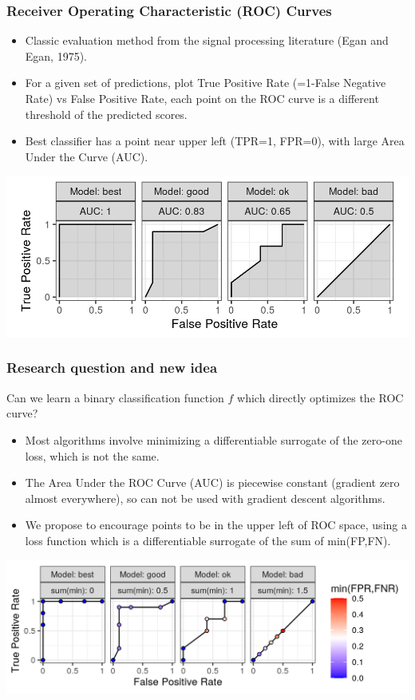 \documentclass[t]{beamer}
\begin{document}
\begin{frame}
  \frametitle{Receiver Operating Characteristic (ROC) Curves}
  \begin{itemize}
  \item Classic evaluation method from the signal processing
    literature (Egan and Egan, 1975).
  \item For a given set of predictions, plot True Positive Rate
    (=1-False Negative Rate) vs False Positive Rate, each point on the
    ROC curve is a different threshold of the predicted scores.
  \item Best classifier has a point near upper left (TPR=1, FPR=0), with large
    Area Under the Curve (AUC).
  \end{itemize}
  \includegraphics[width=\textwidth]{figure-more-than-one-binary}
\end{frame}

\begin{frame}
  \frametitle{Research question and new idea}
  Can we learn a binary classification function $f$ which directly
  optimizes the ROC curve?
  \begin{itemize}
  \item Most algorithms involve minimizing a differentiable surrogate
    of the zero-one loss, which is not the same.
  \item The Area Under the ROC Curve (AUC) is piecewise constant
    (gradient zero almost everywhere), so can not be used with
    gradient descent algorithms.
  \item We propose to encourage points to be in the upper left of ROC
    space, using a loss function which is a differentiable surrogate
    of the sum of min(FP,FN).
  \end{itemize}
  \includegraphics[width=\textwidth]{figure-more-than-one-binary-dots}
\end{frame}
\end{document}
